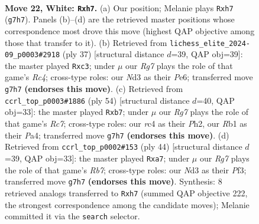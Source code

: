 \documentclass[11pt]{article}
\begin{document}
\clearpage

\begin{figure}[p]\centering
\begin{subfigure}{0.46\textwidth}\centering
\resizebox{\linewidth}{!}{%
\newchessgame
\chessboard[
  setfen={2kr4/ppp3Rp/4p3/5p2/2r5/3N4/PP1K1P1P/1R6 w - - 0 22},
  showmover=false,
  pgfstyle=straightmove, color=movearrow, markmove={g7-h7}
]}
\caption{}
\end{subfigure}\hfill
\begin{subfigure}{0.46\textwidth}\centering
\resizebox{\linewidth}{!}{%
\newchessgame
\chessboard[
  setfen={7r/p3k1p1/p3p2p/2r5/4R3/2P5/P4PPP/3R2K1 b - - 0 19},
  showmover=false,
  pgfstyle=straightmove, color=movearrow, markmove={c5-c3}
]}
\caption{}
\end{subfigure}
\\[4pt]
\begin{subfigure}{0.46\textwidth}\centering
\resizebox{\linewidth}{!}{%
\newchessgame
\chessboard[
  setfen={r4k2/ppR2ppp/8/8/P2R4/5rP1/1P5P/K7 w - - 2 28},
  showmover=false,
  pgfstyle=straightmove, color=movearrow, markmove={c7-b7}
]}
\caption{}
\end{subfigure}\hfill
\begin{subfigure}{0.46\textwidth}\centering
\resizebox{\linewidth}{!}{%
\newchessgame
\chessboard[
  setfen={5rk1/pR5p/4p1p1/2p5/2r5/5P2/P2K2PP/5R2 w - - 0 23},
  showmover=false,
  pgfstyle=straightmove, color=movearrow, markmove={b7-a7}
]}
\caption{}
\end{subfigure}
\caption{\textbf{Move 22, White: \texttt{Rxh7}.} (a) Our position; Melanie plays \texttt{Rxh7} (\texttt{g7h7}). Panels (b)--(d) are the retrieved master positions whose correspondence most drove this move (highest QAP objective among those that transfer to it). (b) Retrieved from \texttt{lichess\_elite\_2024-09\_p0003\#2918} (ply 37) [structural distance $d$=39, QAP obj=39]: the master played \texttt{Rxc3}; under $\mu$ our \emph{Rg7} plays the role of that game's \emph{Rc4}; cross-type roles: our \emph{N}d3 as their \emph{P}e6; transferred move \texttt{g7h7} \textbf{(endorses this move)}. (c) Retrieved from \texttt{ccrl\_top\_p0003\#1886} (ply 54) [structural distance $d$=40, QAP obj=33]: the master played \texttt{Rxb7}; under $\mu$ our \emph{Rg7} plays the role of that game's \emph{Rc7}; cross-type roles: our \emph{r}c4 as their \emph{P}h2, our \emph{R}b1 as their \emph{P}a4; transferred move \texttt{g7h7} \textbf{(endorses this move)}. (d) Retrieved from \texttt{ccrl\_top\_p0002\#153} (ply 44) [structural distance $d$=39, QAP obj=33]: the master played \texttt{Rxa7}; under $\mu$ our \emph{Rg7} plays the role of that game's \emph{Rb7}; cross-type roles: our \emph{N}d3 as their \emph{P}f3; transferred move \texttt{g7h7} \textbf{(endorses this move)}. Synthesis: 8 retrieved analogs transferred to \texttt{Rxh7} (summed QAP objective 222, the strongest correspondence among the candidate moves); Melanie committed it via the \texttt{search} selector.}
\label{fig:thought-m42}
\end{figure}
\end{document}
